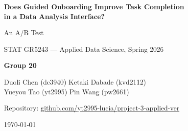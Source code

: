 \documentclass[11pt, a4paper]{article}
\begin{document}

\begin{titlepage}
  \centering
  \vspace*{2cm}
  {\LARGE\bfseries Does Guided Onboarding Improve Task Completion\\[6pt]
   in a Data Analysis Interface?\par}
  \vspace{0.4cm}
  {\large An A/B Test\par}
  \vspace{1.5cm}
  {\large STAT GR5243 --- Applied Data Science, Spring 2026\par}
  \vspace{0.5cm}
  {\normalsize\textbf{Group 20}\par}
  \vspace{0.3cm}
  {\normalsize
    Duoli Chen (dc3940) \quad Ketaki Dabade (kvd2112) \\[4pt]
    Yueyou Tao (yt2995) \quad Pin Wang (pw2661)\par}
  \vspace{0.8cm}
  {\normalsize
    Repository: \href{https://github.com/yt2995-lucia/project-3-applied-ver}
                     {github.com/yt2995-lucia/project-3-applied-ver}\par}
  \vfill
  {\normalsize \today\par}
\end{titlepage}

\begin{abstract}
\noindent
We present a between-subject A/B test investigating whether step-by-step onboarding
hints improve task completion in a web-based data analysis interface. Participants
were randomly assigned to either an unguided control (Group~A, $n=52$) or a guided
treatment (Group~B, $n=45$) in a custom R Shiny application. The primary outcome was
full completion of five sequential data tasks. Group~B achieved a 71.1\% completion
rate versus 42.3\% in Group~A ($\chi^2(1)=6.985$, $p=0.0082$, Cram\'er's $V=0.268$;
Fisher's OR$_{\text{B vs A}}=3.36$, 95\%~CI: [1.44, 7.82]). Time-per-task among
completers was non-significantly longer in Group~B (median 17.0s vs.\ 8.1s,
Mann--Whitney $p=0.096$). Results were robust to outlier removal. Subgroup analysis
revealed that hints benefited experienced users substantially (Fisher $p=0.003$) but
not inexperienced users ($p=1.0$). We conclude that guided onboarding meaningfully
improves task success with a modest, non-significant time cost.
\end{abstract}
\end{document}

